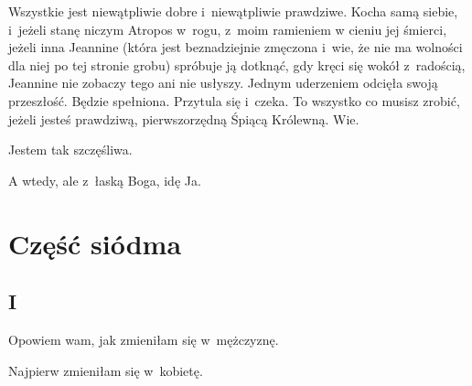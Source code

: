 \documentclass[oneside,polish,12pt,sfheadings]{mwbk}
\begin{document}
Wszystkie jest niewątpliwie dobre i~niewątpliwie prawdziwe. Kocha
samą siebie, i~jeżeli stanę niczym Atropos w~rogu, z~moim ramieniem
w cieniu jej śmierci, jeżeli inna Jeannine (która jest beznadziejnie
zmęczona i~wie, że nie ma wolności dla niej po tej stronie grobu)
spróbuje ją dotknąć, gdy kręci się wokół z~radością, Jeannine nie
zobaczy tego ani nie usłyszy. Jednym uderzeniem odcięła swoją przeszłość.
Będzie spełniona. Przytula się i~czeka. To wszystko co musisz zrobić,
jeżeli jesteś prawdziwą, pierwszorzędną Śpiącą Królewną. Wie.

Jestem tak szczęśliwa.

A wtedy, ale z~łaską Boga, idę Ja.

\part*{Część siódma}

\chapter{I}

Opowiem wam, jak zmieniłam się w~mężczyznę.

Najpierw zmieniłam się w~kobietę.
\end{document}

